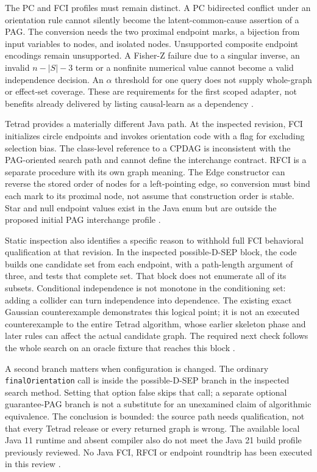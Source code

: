 The PC and FCI profiles must remain distinct. A PC bidirected conflict under an
orientation rule cannot silently become the latent-common-cause assertion of a
PAG. The conversion needs the two proximal endpoint marks, a bijection from
input variables to nodes, and isolated nodes. Unsupported composite endpoint
encodings remain unsupported. A Fisher-Z failure due to a singular inverse,
an invalid $n-|S|-3$ term or a nonfinite numerical value cannot become a valid
independence decision. An $\alpha$ threshold for one query does not supply
whole-graph or effect-set coverage. These are requirements for the first scoped
adapter, not benefits already delivered by listing causal-learn as a dependency
\citep{exec14_causallearn_reuse}.

Tetrad provides a materially different Java path. At the inspected revision,
FCI initializes circle endpoints and invokes orientation code with a flag for
excluding selection bias. The class-level reference to a CPDAG is inconsistent
with the PAG-oriented search path and cannot define the interchange contract.
RFCI is a separate procedure with its own graph meaning. The Edge constructor
can reverse the stored order of nodes for a left-pointing edge, so conversion
must bind each mark to its proximal node, not assume that construction order
is stable. Star and null endpoint values exist in the Java enum but are outside
the proposed initial PAG interchange profile
\citep{exec14_java_latent_sources}.

Static inspection also identifies a specific reason to withhold full FCI
behavioral qualification at that revision. In the inspected possible-D-SEP
block, the code builds one candidate set from each endpoint, with a path-length
argument of three, and tests that complete set. That block does not enumerate
all of its subsets. Conditional independence is not monotone in the conditioning
set: adding a collider can turn independence into dependence. The existing
exact Gaussian counterexample demonstrates this logical point; it is not an
executed counterexample to the entire Tetrad algorithm, whose earlier skeleton
phase and later rules can affect the actual candidate graph. The required next
check follows the whole search on an oracle fixture that reaches this block
\citep{exec13_java_examples,exec14_java_latent_sources}.

A second branch matters when configuration is changed. The ordinary
\texttt{finalOrientation} call is inside the possible-D-SEP branch in the
inspected search method. Setting that option false skips that call; a separate
optional guarantee-PAG branch is not a substitute for an unexamined claim of
algorithmic equivalence. The conclusion is bounded: the source path needs
qualification, not that every Tetrad release or every returned graph is wrong.
The available local Java 11 runtime and absent compiler also do not meet the
Java 21 build profile previously reviewed. No Java FCI, RFCI or endpoint
roundtrip has been executed in this review
\citep{exec14_java_latent_sources,exec13_tetrad_reuse_primary}.

